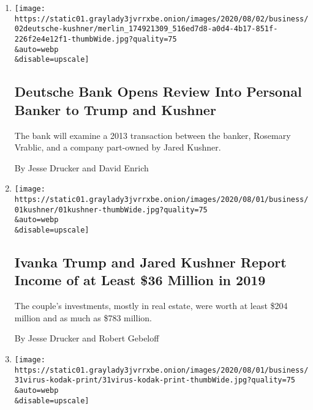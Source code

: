 \begin{enumerate}
\def\labelenumi{\arabic{enumi}.}
\item
  \href{/2020/08/02/business/kushner-deutsche-trump-rosemary-vrablic.html}{}

  \texttt{[image: https://static01.graylady3jvrrxbe.onion/images/2020/08/02/business/02deutsche-kushner/merlin\_174921309\_516ed7d8-a0d4-4b17-851f-226f2e4e12f1-thumbWide.jpg?quality=75\\\&auto=webp\\\&disable=upscale]}

  \hypertarget{deutsche-bank-opens-review-into-personal-banker-to-trump-and-kushner}{%
  \subsection{Deutsche Bank Opens Review Into Personal Banker to Trump
  and
  Kushner}\label{deutsche-bank-opens-review-into-personal-banker-to-trump-and-kushner}}

  The bank will examine a 2013 transaction between the banker, Rosemary
  Vrablic, and a company part-owned by Jared Kushner.

  By Jesse Drucker and David Enrich
\item
  \href{/2020/08/01/business/ivanka-trump-jared-kushner-financial-disclosure.html}{}

  \texttt{[image: https://static01.graylady3jvrrxbe.onion/images/2020/08/01/business/01kushner/01kushner-thumbWide.jpg?quality=75\\\&auto=webp\\\&disable=upscale]}

  \hypertarget{ivanka-trump-and-jared-kushner-report-income-of-at-least-36-million-in-2019}{%
  \subsection{Ivanka Trump and Jared Kushner Report Income of at Least
  \$36 Million in
  2019}\label{ivanka-trump-and-jared-kushner-report-income-of-at-least-36-million-in-2019}}

  The couple's investments, mostly in real estate, were worth at least
  \$204 million and as much as \$783 million.

  By Jesse Drucker and Robert Gebeloff
\item
  \href{/2020/07/31/business/kodak-ceo-stock-options.html}{}

  \texttt{[image: https://static01.graylady3jvrrxbe.onion/images/2020/08/01/business/31virus-kodak-print/31virus-kodak-print-thumbWide.jpg?quality=75\\\&auto=webp\\\&disable=upscale]}

  \hypertarget{kodak-ceo-got-stock-options-day-before-news-of-loan-sent-stock-soaring}{%
}
\end{enumerate}
